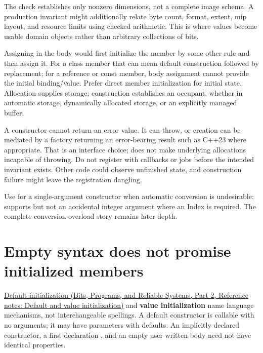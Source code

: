The check establishes only nonzero dimensions, not a complete image schema. A production invariant might additionally relate byte count, format, extent, mip layout, and resource limits using checked arithmetic. This is where values become usable domain objects rather than arbitrary collections of bits.

Assigning  in the body would first initialize the member by some other rule and then assign it. For a class member that can mean default construction followed by replacement; for a reference or const member, body assignment cannot provide the initial binding/value. Prefer direct member initialization for initial state. Allocation supplies storage; construction establishes an occupant, whether in automatic storage, dynamically allocated storage, or an explicitly managed buffer.

A constructor cannot return an error value. It can throw, or creation can be mediated by a factory returning an error-bearing result such as C++23  where appropriate. That is an interface choice;  does not make underlying allocations incapable of throwing. Do not register  with callbacks or jobs before the intended invariant exists. Other code could observe unfinished state, and construction failure might leave the registration dangling.

Use  for a single-argument constructor when automatic conversion is undesirable:  supports  but not an accidental integer argument where an Index is required. The complete conversion-overload story remains later depth.

\section{Empty syntax does not promise initialized members}\label{05-engine-i-ch003-empty-syntax-does-not-promise-initialized-members}

\hypertarget{05-engine-i-ch003-empty-syntax-does-not-promise-initialized-members}{}

\href{../01-Bits-Programs-and-Reliable-Systems-P02/main.pdf\#appendix-ba8c1a9fe03f}{Default initialization (Bits, Programs, and Reliable Systems, Part 2, Reference notes: Default and value initialization)} and \textbf{value initialization} name language mechanisms, not interchangeable spellings. A default constructor is callable with no arguments; it may have parameters with defaults. An implicitly declared constructor, a first-declaration , and an empty user-written body need not have identical properties.

